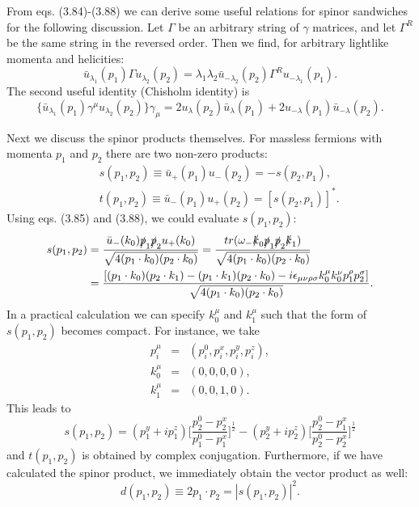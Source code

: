 From eqs. (3.84)-(3.88) we can derive some useful relations for spinor sandwiches for the following discussion. Let $\Gamma$ be an arbitrary string of $\gamma$ matrices, and let $\Gamma^R$ be the same string in the reversed order. Then we find, for arbitrary lightlike momenta and helicities:
\begin{equation}
\bar{u}_{\lambda_1}(p_1)\Gamma u_{\lambda_2}(p_2)=\lambda_1\lambda_2\bar{u}_{-\lambda_2}(p_2)\Gamma^R u_{-\lambda_1}(p_1).
\end{equation}
The second useful identity (Chisholm identity) is 
\begin{equation}
\{\bar{u}_{\lambda_1}(p_1)\gamma^\mu u_{\lambda_2}(p_2)\}\gamma_\mu=2u_\lambda(p_2)\bar{u}_\lambda(p_1)+2u_{-\lambda}(p_1)\bar{u}_{-\lambda}(p_2).
\end{equation}

Next we discuss the spinor products themselves. For massless fermions with momenta $p_1$ and $p_2$ there are two non-zero products:
\begin{eqnarray}
&&s(p_1,p_2)\equiv\bar{u}_+(p_1)u_-(p_2)=-s(p_2,p_1),\nonumber\\
&&t(p_1,p_2)\equiv\bar{u}_-(p_1)u_+(p_2)=[s(p_2,p_1)]^\ast.
\end{eqnarray}
Using eqs. (3.85) and (3.88), we could evaluate $s(p_1,p_2)$:
\begin{align}
s(p_1,p_2)&=\frac{\bar{u}_-(k_0)\slashed p_1\slashed p_2 u_+(k_0)}{\sqrt{4(p_1\cdot k_0)(p_2\cdot k_0)}}
=\frac{tr(\omega_-\slashed k_0\slashed p_1\slashed p_2\slashed k_1)}{\sqrt{4(p_1\cdot k_0)(p_2\cdot k_0)}}\nonumber\\
&=\frac{[(p_1\cdot k_0)(p_2\cdot k_1)-(p_1\cdot k_1)(p_2\cdot k_0)-i\epsilon_{\mu\nu\rho\sigma}k_0^\mu k_0^\nu p_1^\rho p_2^\sigma]}{\sqrt{4(p_1\cdot k_0)(p_2\cdot k_0)}}.\nonumber\\
\end{align}
In a practical calculation we can specify $k_0^\mu$ and $k_1^\mu$ such that the form of $s(p_1,p_2)$ becomes compact. For instance, we take
\begin{eqnarray}
p_i^\mu&=&(p_i^0,p_i^x,p_i^y,p_i^z),\nonumber\\
k_0^\mu&=&(0,0,0,0),\nonumber\\
k_1^\mu&=&(0,0,1,0).
\end{eqnarray}
This leads to 
\begin{equation}
s(p_1,p_2)=(p_1^y+ip_1^z)\biggl[\frac{p^0_2-p_2^x}{p_1^0-p_1^x}\biggr]^\frac{1}{2}-(p_2^y+ip_2^z)\biggl[\frac{p^0_2-p_1^x}{p_2^0-p_2^x}\biggr]^\frac{1}{2}
\end{equation}
and $t(p_1,p_2)$ is obtained by complex conjugation. Furthermore, if we have calculated the spinor product, we immediately obtain the vector product as well:
\begin{equation}
d(p_1,p_2)\equiv 2p_1\cdot p_2=|s(p_1,p_2)|^2.
\end{equation}

